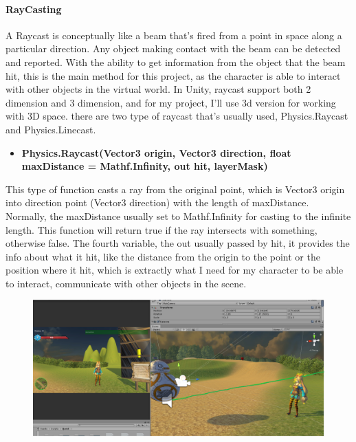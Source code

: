 \documentclass[a4paper, 13pt]{extarticle}
\begin{document}
\paragraph{RayCasting}
  A Raycast is conceptually like a beam that's fired from a point in space along a particular direction. Any object making contact with the beam can be detected and reported. With the ability to get information from the object that the beam hit, this is the main method for this project, as the character is able to interact with other objects in the virtual world. In Unity, raycast support both 2 dimension and 3 dimension, and for my project, I'll use 3d version for working with 3D space. there are two type of raycast that's usually used, Physics.Raycast and Physics.Linecast.
  \begin{itemize}
  	\item \bfseries Physics.Raycast(Vector3 origin,  Vector3 direction, float maxDistance = Mathf.Infinity, out hit, layerMask)	 	
  \end{itemize}
 	This type of function casts a ray from the original point, which is Vector3 origin into direction point (Vector3 direction) with the length of maxDistance. Normally, the maxDistance usually set to Mathf.Infinity for casting to the infinite length. This function will return true if the ray intersects with something, otherwise false. The fourth variable, the out usually passed by hit, it provides the info about what it hit, like the distance from the origin to the point or the position where it hit, which is extractly what I need for my character to be able to interact, communicate with other objects in the scene.
 	\begin{figure}[h]
 		
 		\begin{minipage}{1\textwidth}
 			\centering
 			\includegraphics[width=1\linewidth]{intructions/RayCast_example1.png}
 			\centering
 			\label{fig:test14}
 		\end{minipage}
 	
 	\end{figure} 
 	
\end{document}
